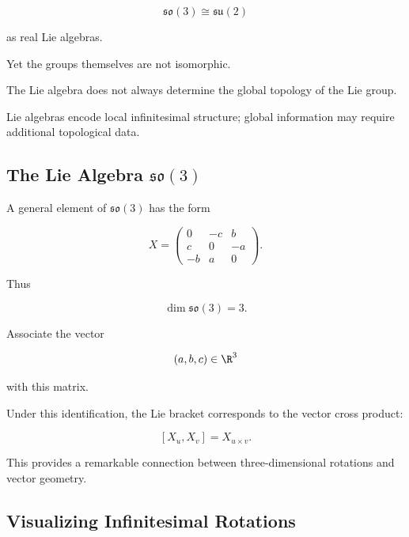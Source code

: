 \[ \mathfrak{so}(3)\cong\mathfrak{su}(2) \]

as real Lie algebras.

Yet the groups themselves are not isomorphic.

\begin{warningbox}
The Lie algebra does not always determine the global topology of the Lie
group.

Lie algebras encode local infinitesimal structure; global information may
require additional topological data.
\end{warningbox}

\subsection{The Lie Algebra \(\mathfrak{so}(3)\)}
\label{subsec:so3-lie-algebra}

A general element of \(\mathfrak{so}(3)\) has the form

\[ X=
\begin{pmatrix}
0&-c&b\\
c&0&-a\\
-b&a&0
\end{pmatrix}. \]

Thus

\[ \dim\mathfrak{so}(3)=3. \]

Associate the vector

\[ (a,b,c)\in\R^3 \]

with this matrix.

Under this identification, the Lie bracket corresponds to the vector cross
product:

\[ [X_u,X_v]=X_{u\times v}. \]

This provides a remarkable connection between three-dimensional rotations
and vector geometry.

\subsection{Visualizing Infinitesimal Rotations}
\label{subsec:infinitesimal-rotations}

\begin{center}
\end{center}

